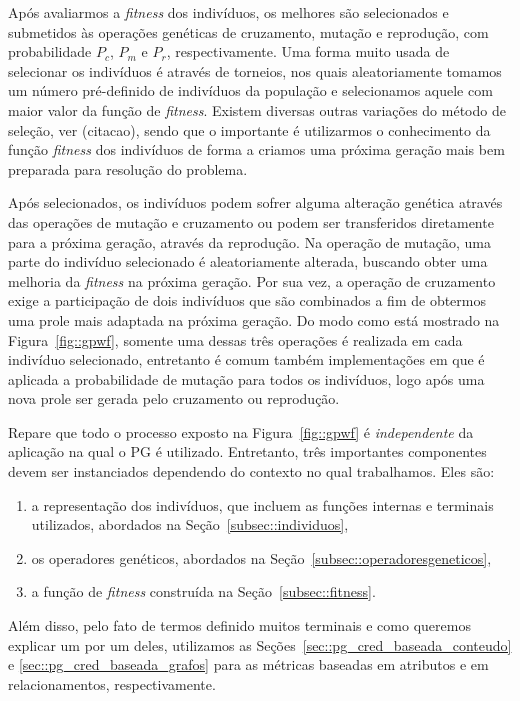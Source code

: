 Após avaliarmos a \textit{fitness} dos indivíduos, os melhores são selecionados e submetidos às operações genéticas de cruzamento, mutação e reprodução, com probabilidade $P_c$, $P_m$ e $P_r$, respectivamente.
Uma forma muito usada de selecionar os indivíduos é através de torneios, nos quais aleatoriamente tomamos um número pré-definido de indivíduos da população e selecionamos aquele com maior valor da função de \textit{fitness}. Existem diversas outras variações do método de seleção, ver (citacao), sendo que o importante é utilizarmos o conhecimento da função \textit{fitness} dos indivíduos de forma a criamos uma próxima geração mais bem preparada para resolução do problema. 

Após selecionados, os indivíduos podem sofrer alguma alteração genética através das operações de mutação e cruzamento ou podem ser transferidos diretamente para a próxima geração, através da reprodução. 
Na operação de mutação, uma parte do indivíduo selecionado é aleatoriamente alterada, buscando obter uma melhoria da \textit{fitness} na próxima geração.
Por sua vez, a operação de cruzamento exige a participação de dois indivíduos que são combinados a fim de obtermos uma prole mais adaptada na próxima geração.
Do modo como está mostrado na Figura~\ref{fig::gpwf}, somente uma dessas três operações é realizada em cada indivíduo selecionado, entretanto é comum também implementações em que é aplicada a probabilidade de mutação para todos os indivíduos, logo após uma nova prole ser gerada pelo cruzamento ou reprodução.

Repare que todo o processo exposto na Figura~\ref{fig::gpwf} é \textit{independente} da aplicação na qual o \textsc{PG} é utilizado. 
Entretanto, três importantes componentes devem ser instanciados dependendo do contexto no qual trabalhamos. Eles são:
\begin{enumerate}
\item a representação dos indivíduos, que incluem as funções internas e terminais utilizados, abordados na Seção~\ref{subsec::individuos}, 
\item os operadores genéticos, abordados na Seção~\ref{subsec::operadoresgeneticos},
\item a função de \textit{fitness} construída na Seção~\ref{subsec::fitness}.
\end{enumerate}
Além disso, pelo fato de termos definido muitos terminais e como queremos explicar um por um deles, utilizamos as Seções~\ref{sec::pg_cred_baseada_conteudo} e \ref{sec::pg_cred_baseada_grafos} para as métricas baseadas em atributos e em relacionamentos, respectivamente.

